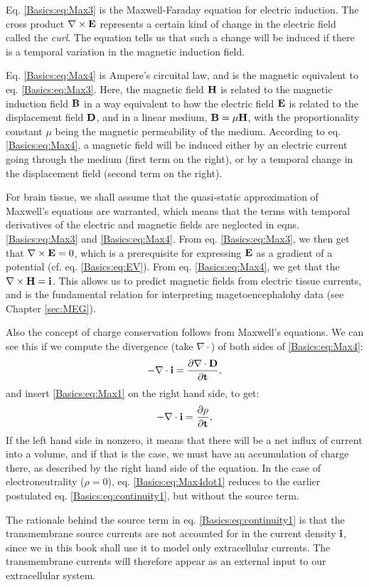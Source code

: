 Eq. \ref{Basics:eq:Max3} is the Maxwell-Faraday equation for electric induction. The cross product $\nabla \times {\bf E}$ represents a certain kind of change in the electric field called the \textit{curl}. The equation tells us that such a change will be induced if there is a temporal variation in the magnetic induction field. 

Eq.  \ref{Basics:eq:Max4} is Ampere's circuital law, and is the magnetic equivalent to eq. \ref{Basics:eq:Max3}. Here, the magnetic field ${\bf H}$ is related to the magnetic induction field ${\bf B}$ in a way equivalent to how the electric field ${\bf E}$ is related to the displacement field ${\bf D}$, and in a linear medium, ${\bf B} = \mu{\bf H}$, with the proportionality constant $\mu$ being the magnetic permeability of the medium. According to eq. \ref{Basics:eq:Max4}, a magnetic field will be induced either by an electric current going through the medium (first term on the right), or by a temporal change in the displacement field (second term on the right). 

For brain tissue, we shall assume that the quasi-static approximation of Maxwell's equations are warranted, which means that the terms with temporal derivatives of the electric and magnetic fields are neglected in eqns.  \ref{Basics:eq:Max3} and  \ref{Basics:eq:Max4}. From eq. \ref{Basics:eq:Max3}, we then get that $\nabla \times {\bf E} = 0$, which is a prerequisite for expressing ${\bf E}$ as a gradient of a potential (cf. eq. \ref{Basics:eq:EV}). From eq. \ref{Basics:eq:Max4}, we get that the $\nabla \times {\bf H} = \bf{i}$. This allows us to predict magnetic fields from electric tissue currents, and is the fundamental relation for interpreting magetoencephalohy data (see Chapter \ref{sec:MEG}).

Also the concept of charge conservation follows from Maxwell's equations. We can see this if we 
compute the divergence (take $\nabla \cdot$) of both sides of \ref{Basics:eq:Max4}:
\begin{equation}
- \nabla \cdot \bf{i} =  \frac{\partial {\bf \nabla \cdot D}}{\partial t}, 
\label{Basics:eq:Max4dot}
\end{equation}
and insert \ref{Basics:eq:Max1} on the right hand side, to get:
\begin{equation}
- \nabla \cdot \bf{i} =  \frac{\partial \rho}{\partial t},
\label{Basics:eq:Max4dot1}
\end{equation}
If the left hand side in nonzero, it means that there will be a net influx of current into a volume, and if that is the case, we must have an accumulation of charge there, as described by the right hand side of the equation. In the case of electroneutrality ($\rho = 0$), eq. \ref{Basics:eq:Max4dot1} reduces to the earlier postulated eq. \ref{Basics:eq:continuity1}, but without the source term. 

The rationale behind the source term in eq. \ref{Basics:eq:continuity1} is that the transmembrane source currents are not accounted for in the current density $\bf{i}$, since we in this book shall use it to model only extracellular currents. The transmembrane currents will therefore appear as an external input to our extracellular system. 
